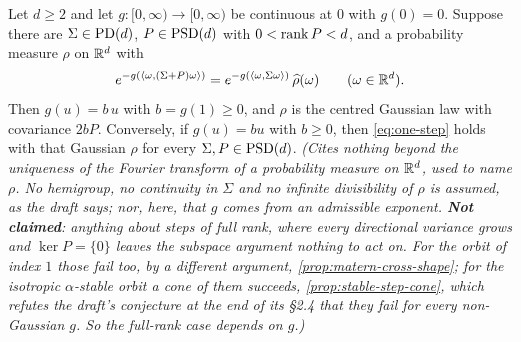 \begin{theorem}
\label{thm:rank-deficient-step}
\leanok
Let $d \ge 2$ and let $g : [0,\infty) \to [0,\infty)$ be continuous at $0$ with $g(0) = 0$.
Suppose there are $\Sigma \in \mathrm{PD}(d)$, $P \in \mathrm{PSD}(d)$ with $0 < \operatorname{rank} P < d$, and a probability
measure $\rho$ on $\mathbb{R}^d$ with
\begin{equation}\label{eq:one-step}
  e^{-g(\langle\omega,(\Sigma+P)\omega\rangle)}
   = e^{-g(\langle\omega,\Sigma\omega\rangle)}\,\widehat\rho(\omega)
   \qquad (\omega \in \mathbb{R}^d).
\end{equation}
Then $g(u) = b\,u$ with $b = g(1) \ge 0$, and $\rho$ is the centred Gaussian law with covariance
$2bP$. Conversely, if $g(u) = bu$ with $b \ge 0$, then \ref{eq:one-step} holds with that Gaussian
$\rho$ for every $\Sigma, P \in \mathrm{PSD}(d)$.
\statusT\quad\emph{(Cites nothing beyond the uniqueness of the Fourier transform of a
probability measure on $\mathbb{R}^d$, used to name $\rho$. No hemigroup, no continuity in $\Sigma$ and
no infinite divisibility of $\rho$ is assumed, as the draft says; nor, here, that $g$ comes from
an admissible exponent. \textbf{Not claimed}: anything about steps of full rank, where every
directional variance grows and $\ker P = \{0\}$ leaves the subspace argument nothing to act on.
For the \Matern{} orbit of index $1$ those fail too, by a different argument,
\ref{prop:matern-cross-shape}; for the isotropic $\alpha$-stable orbit a cone of them succeeds,
\ref{prop:stable-step-cone}, which refutes the draft's conjecture at the end of its \S 2.4 that
they fail for every non-Gaussian $g$. So the full-rank case depends on $g$.)}
\end{theorem}


